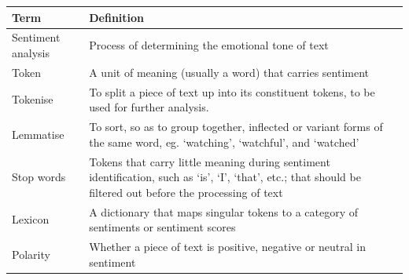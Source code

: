 \documentclass[12pt, bibliography=totocnumbered, a4paper]{scrartcl}
\def\bf#1{\textbf{#1}}
\begin{document}
\begin{center}
	\begin{longtable}{|p{}|p{}|}
		\hline
		\bf{Term}                        & \bf{Definition}                                                                                                                                                                                                                                     \\
		\hline
		Sentiment analysis               & Process of determining the emotional tone of text                                                                                                                                                                                                   \\
		\hline
		Token                            & A unit of meaning (usually a word) that carries sentiment                                                                                                                                                                                           \\
		\hline
		Tokenise                         & To split a piece of text up into its constituent tokens, to be used for further analysis.                                                                                                                                                           \\
		\hline
		Lemmatise                        & To sort, so as to group together, inflected or variant forms of the same word, eg. `watching', `watchful', and `watched'                                                                                                                            \\
		\hline
		Stop words                       & Tokens that carry little meaning during sentiment identification, such as `is', `I', `that', etc.; that should be filtered out before the processing of text                                                                                        \\
		\hline
		Lexicon                          & A dictionary that maps singular tokens to a category of sentiments or sentiment scores                                                                                                                                                              \\
		\hline
		Polarity                         & Whether a piece of text is positive, negative or neutral in sentiment                                                                                                                                                                               \\

\end{longtable}
\end{center}
\end{document}
